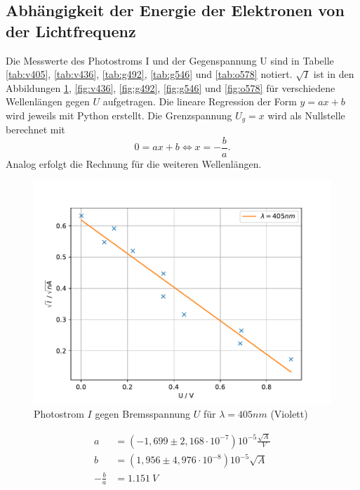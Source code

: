 \subsection{Abhängigkeit der Energie der Elektronen von der Lichtfrequenz}
Die Messwerte des Photostroms I und der Gegenspannung U sind in Tabelle \ref{tab:v405}, \ref{tab:v436}, \ref{tab:g492}, \ref{tab:g546} und \ref{tab:o578} notiert.
$\sqrt{I}$ ist in den Abbildungen \ref{fig:v405}, \ref{fig:v436}, \ref{fig:g492}, \ref{fig:g546} und \ref{fig:o578} für verschiedene Wellenlängen gegen $U$ aufgetragen.
Die lineare Regression der Form $y=ax+b$ wird jeweils mit Python erstellt.
Die Grenzspannung $U_g=x$ wird als Nullstelle berechnet mit
\begin{equation*}
0=ax+b \Leftrightarrow x=-\frac{b}{a}.
\end{equation*}
Analog erfolgt die Rechnung für die weiteren Wellenlängen.

\FloatBarrier
\begin{figure}[h!]
  \centering
  \includegraphics[width=\textwidth]{Violett405.pdf}
  \caption{Photostrom $I$ gegen Bremsspannung $U$ für $\lambda=405nm$ (Violett)}
  \label{fig:v405}
\end{figure}
\FloatBarrier
\begin{align*}
  a &= (-1,699 \pm 2,168 \cdot 10^{-7}) 10^{-5}\si{\frac{\sqrt{A}}{V}}\\
  b &= (1,956 \pm 4,976 \cdot 10^{-8}) 10^{-5} \si{\sqrt{A}}\\
  -\frac{b}{a} &= \SI{1.151}{V}
\end{align*}
\FloatBarrier

\FloatBarrier
